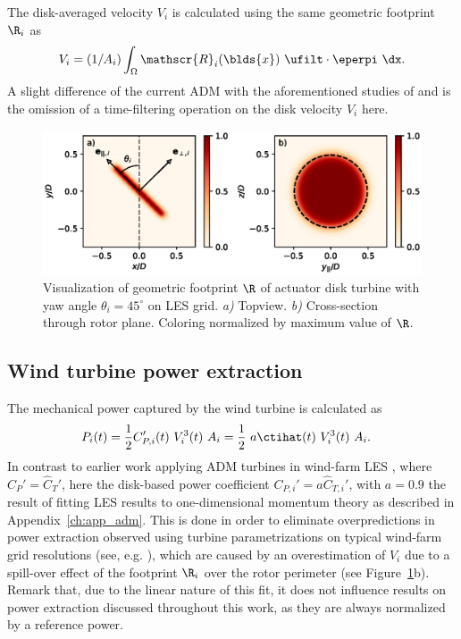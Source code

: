 The disk-averaged velocity $V_i$ is calculated using the same geometric footprint $\R_i$ as 
\begin{equation}
V_{i} = (1/A_i) \int_\Omega \mathscr{R}_i(\blds{x})\ \ufilt \cdot \eperpi \ \dx.
\end{equation} 
A slight difference of the current ADM with the aforementioned studies of \cite{meyers2010large} and \cite{calaf2010large} is the omission of a time-filtering operation on the disk velocity $V_i$ here. 

\begin{figure}
	\centering
	\includegraphics[width=\textwidth]{chapters/methodology/visualize_R.eps}
	\caption[Visualization of geometric footprint $\R$ of actuator disk turbine with yaw angle $\theta_i = 45^\circ$ on LES grid.]{Visualization of geometric footprint $\R$ of actuator disk turbine with yaw angle $\theta_i = 45^\circ$ on LES grid. \emph{a)} Topview. \emph{b)} Cross-section through rotor plane. Coloring normalized by maximum value of $\R$. \label{fig:Rkernel}}
\end{figure}

\subsection{Wind turbine power extraction}
The mechanical power captured by the wind turbine is calculated as 
\begin{align}
P_i(t) &= \frac{1}{2} C_{P,i}'(t)~V_{i}^3(t)~A_i = \frac{1}{2}~a\ctihat(t)~V_{i}^3(t)~A_i.\label{eq:define_power}
\end{align}
In contrast to earlier work applying ADM turbines in wind-farm LES \citep{meyers2010large, calaf2010large, goit2015optimal}, where $C_P' = \widehat{C}_T'$, here the disk-based power coefficient $C_{P,i}' = a\widehat{C}_{T,i}'$, with $a = 0.9$ the result of fitting LES results to one-dimensional momentum theory as described in Appendix~\ref{ch:app_adm}. This is done in order to eliminate overpredictions in power extraction observed using turbine parametrizations on typical wind-farm grid resolutions (see, e.g. \citealp{martinez2016wind, martinez2015large}), which are caused by an overestimation of $V_i$ due to a spill-over effect of the footprint $\R_i$ over the rotor perimeter (see Figure~\ref{fig:Rkernel}b). Remark that, due to the linear nature of this fit, it does not influence results on power extraction discussed throughout this work, as they are always normalized by a reference power. 

